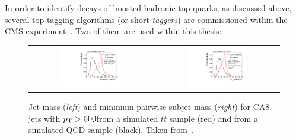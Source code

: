 In order to identify decays of boosted hadronic top quarks, as discussed above, several top tagging algorithms (or short \textit{taggers}) are commissioned within the CMS experiment~\cite{CMS:2014fya, CMS-DP-2014-036}. Two of them are used within this thesis:
\begin{description}
\begin{figure}[!tp]
  \centering 
  \begin{tabular}{cc}
    \includegraphics[width=0.49\textwidth]{figures/Draw2HistogramsFrom1File_QQ_MASS_CUT_PT_TT_MASS_CUT_PT_JetPt500.pdf} & 
    \includegraphics[width=0.49\textwidth]{figures/Draw2HistogramsFrom1File_QQ_MINM_CUT_PT_MASS_NSUB_TT_MINM_CUT_PT_MASS_NSUB_JetPt500.pdf}
  \end{tabular}
  \caption{Jet mass (\textit{left}) and minimum pairwise subjet mass (\textit{right}) for CA8 jets with $p_{\text{T}} > 500$\gev from a simulated $t\bar{t}$ \powheg sample (red) and from a simulated QCD \pythia sample (black). Taken from~\cite{CMS:2014fya}.}
  \label{fig:boosted_top_cms_variables}
\end{figure}

\end{description}
